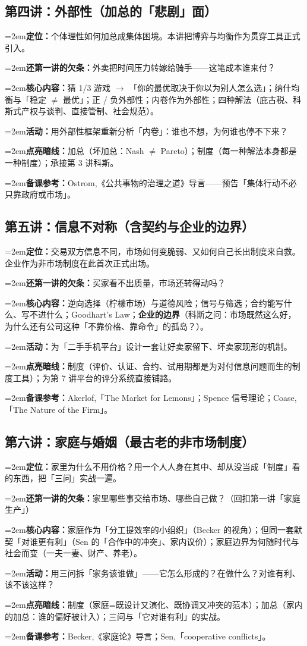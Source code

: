 \documentclass[10pt,a4paper]{ctexart}
\newcommand{\field}[1]{\par\noindent\hangindent=2em\textbf{#1}\hspace{0.3em}}
\begin{document}
\subsection{第四讲：外部性（加总的「悲剧」面）}
\field{定位：}个体理性如何加总成集体困境。本讲把博弈与均衡作为贯穿工具正式引入。
\field{还第一讲的欠条：}外卖把时间压力转嫁给骑手——这笔成本谁来付？
\field{核心内容：}猜 1/3 游戏 $\to$ 「你的最优取决于你以为别人怎么选」；纳什均衡与「稳定 $\neq$ 最优」；正 / 负外部性；内卷作为外部性；四种解法（庇古税、科斯式产权与谈判、直接管制、社会规范）。
\field{活动：}用外部性框架重新分析「内卷」：谁也不想，为何谁也停不下来？
\field{点亮暗线：}加总（坏加总：Nash $\neq$ Pareto）；制度（每一种解法本身都是一种制度）；承接第 3 讲科斯。
\field{备课参考：}Ostrom,《公共事物的治理之道》导言——预告「集体行动不必只靠政府或市场」。

\subsection{第五讲：信息不对称（含契约与企业的边界）}
\field{定位：}交易双方信息不同，市场如何变脆弱、又如何自己长出制度来自救。企业作为非市场制度在此首次正式出场。
\field{还第一讲的欠条：}买家看不出质量，市场还转得动吗？
\field{核心内容：}逆向选择（柠檬市场）与道德风险；信号与筛选；合约能写什么、写不进什么；Goodhart's Law；\textbf{企业的边界}（科斯之问：市场既然这么好，为什么还有公司这种「不靠价格、靠命令」的孤岛？）。
\field{活动：}为「二手手机平台」设计一套让好卖家留下、坏卖家现形的机制。
\field{点亮暗线：}制度（评价、认证、合约、试用期都是为对付信息问题而生的制度工具）；为第 7 讲平台的评分系统直接铺路。
\field{备课参考：}Akerlof,「The Market for Lemons」；Spence 信号理论；Coase,「The Nature of the Firm」。

\subsection{第六讲：家庭与婚姻（最古老的非市场制度）}
\field{定位：}家里为什么不用价格？用一个人人身在其中、却从没当成「制度」看的东西，把「三问」实战一遍。
\field{还第一讲的欠条：}家里哪些事交给市场、哪些自己做？（回扣第一讲「家庭生产」）
\field{核心内容：}家庭作为「分工提效率的小组织」（Becker 的视角）；但同一套默契「对谁更有利」（Sen 的「合作中的冲突」、家内议价）；家庭边界为何随时代与社会而变（一夫一妻、财产、养老）。
\field{活动：}用三问拆「家务该谁做」——它怎么形成的？在做什么？对谁有利、该不该这样？
\field{点亮暗线：}制度（家庭=既设计又演化、既协调又冲突的范本）；加总（家内的加总：谁的偏好被计入）；三问与「它对谁有利」的实战。
\field{备课参考：}Becker,《家庭论》导言；Sen,「cooperative conflicts」。
\end{document}
